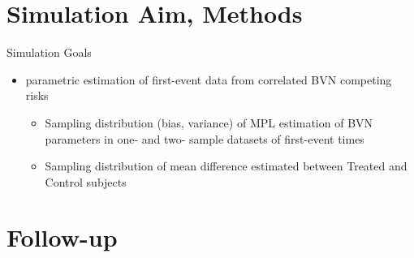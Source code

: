 \documentclass[10pt]{beamer}
\begin{document}
\section{Simulation Aim, Methods}

\begin{frame}{Simulation Goals}
\begin{itemize}
\item
  {\color{DarkBlue}{Aim:}} parametric estimation of \alert{first-event data} from correlated
  BVN competing risks

  \begin{itemize}
  \item
    Sampling distribution (\alert{bias, variance}) of MPL estimation of
    BVN parameters in one- and two- sample datasets of first-event times
  \item
    Sampling distribution of mean difference estimated between Treated
    and Control subjects
  \end{itemize}
\end{itemize}
\end{frame}







\section{Follow-up}
\end{document}
